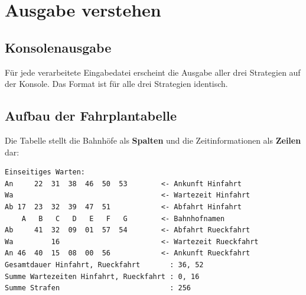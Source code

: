 \documentclass[12pt,a4paper]{article}
\begin{document}
\section{Ausgabe verstehen}

\subsection{Konsolenausgabe}

Für jede verarbeitete Eingabedatei erscheint die Ausgabe aller drei Strategien auf der Konsole. Das Format ist für alle drei Strategien identisch.

\subsection{Aufbau der Fahrplantabelle}

Die Tabelle stellt die Bahnhöfe als \textbf{Spalten} und die Zeitinformationen als \textbf{Zeilen} dar:

\begin{lstlisting}[caption={Beispielausgabe -- Einseitiges Warten (Beispiel2)}]
Einseitiges Warten:
An     22  31  38  46  50  53        <- Ankunft Hinfahrt
Wa                                   <- Wartezeit Hinfahrt
Ab 17  23  32  39  47  51            <- Abfahrt Hinfahrt
    A   B   C   D   E   F   G        <- Bahnhofnamen
Ab     41  32  09  01  57  54        <- Abfahrt Rueckfahrt
Wa         16                        <- Wartezeit Rueckfahrt
An 46  40  15  08  00  56            <- Ankunft Rueckfahrt
Gesamtdauer Hinfahrt, Rueckfahrt       : 36, 52
Summe Wartezeiten Hinfahrt, Rueckfahrt : 0, 16
Summe Strafen                          : 256
\end{lstlisting}
\end{document}
